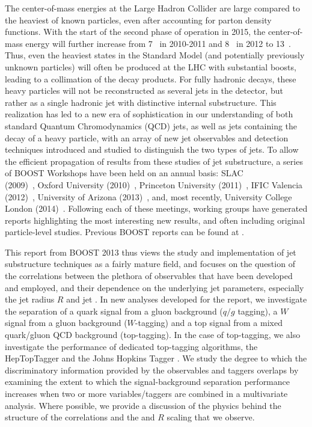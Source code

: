 The center-of-mass energies at the Large Hadron Collider are large compared to the heaviest of known particles, even after accounting for parton density functions. With the start of the second phase of operation in 2015, the center-of-mass energy will further increase from 7~\tev{} in 2010-2011 and 8~\tev{} in 2012 to 13~\tev{}. Thus, even the heaviest states in the Standard Model (and potentially previously unknown particles) will often be produced at the LHC with substantial boosts, leading to a collimation of the decay products.  For fully hadronic decays, these heavy particles will not be reconstructed as several jets in the detector, but rather as a single hadronic jet with distinctive internal substructure.  This realization has led to a new era of sophistication in our understanding of both standard Quantum Chromodynamics (QCD) jets, as well as jets containing the decay of a heavy particle, with an array of new jet observables and detection techniques introduced and studied to distinguish the two types of jets.  To allow the efficient propagation of  results from these studies of jet substructure, a series of BOOST Workshops have been held on an annual basis:
SLAC\\ (2009)~\cite{Boost:2009xxold},
Oxford University (2010)~\cite{Boost:2010xxold},
Princeton University (2011)~\cite{Boost:2011xxold},
IFIC Valencia (2012)~\cite{Boost:2012xxold}, 
University of Arizona (2013)~\cite{Boost:2013xxold},
and, most recently, University College London (2014)~\cite{Boost:2014xxold}.
Following each of these meetings, working groups have generated reports
highlighting the most interesting new results, and often including original particle-level studies. Previous BOOST reports can be found at \cite{Abdesselam:2010pt,Altheimer:2012mn,Altheimer:2013yza}.

This report from BOOST 2013 thus views the study and implementation of jet substructure techniques as a fairly mature field, and focuses on the question of the correlations between the plethora of observables that have been developed and employed, and their dependence on the underlying jet parameters, especially the jet radius $R$ and jet \pt. In new analyses developed for the report, we investigate the separation of a quark signal from a gluon background ($q/g$ tagging), a $W$ signal from a gluon background ($W$-tagging) and a top signal from a mixed quark/gluon QCD background (top-tagging). In the case of top-tagging, we also investigate the performance of dedicated top-tagging algorithms, the HepTopTagger \cite{Plehn:2010st} and the Johns Hopkins Tagger \cite{Kaplan:2008ie}. We study the degree to which the discriminatory information provided by the observables and taggers overlaps by examining the extent to which the signal-background separation performance increases when two or more variables/taggers are combined in a multivariate analysis. Where possible, we provide a discussion of the physics behind the structure of the correlations and the \pt and $R$ scaling that we observe. 




